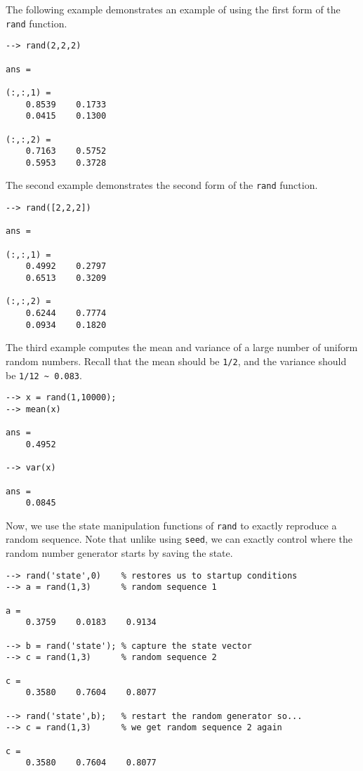 The following example demonstrates an example of using the first form of the \verb|rand| function.
\begin{verbatim}
--> rand(2,2,2)

ans = 

(:,:,1) = 
    0.8539    0.1733 
    0.0415    0.1300 

(:,:,2) = 
    0.7163    0.5752 
    0.5953    0.3728 
\end{verbatim}
The second example demonstrates the second form of the \verb|rand| function.
\begin{verbatim}
--> rand([2,2,2])

ans = 

(:,:,1) = 
    0.4992    0.2797 
    0.6513    0.3209 

(:,:,2) = 
    0.6244    0.7774 
    0.0934    0.1820 
\end{verbatim}
The third example computes the mean and variance of a large number of uniform random numbers.  Recall that the mean should be \verb|1/2|, and the variance should be \verb|1/12 ~ 0.083|.
\begin{verbatim}
--> x = rand(1,10000);
--> mean(x)

ans = 
    0.4952 

--> var(x)

ans = 
    0.0845 
\end{verbatim}
Now, we use the state manipulation functions of \verb|rand| to exactly reproduce 
a random sequence.  Note that unlike using \verb|seed|, we can exactly control where
the random number generator starts by saving the state.
\begin{verbatim}
--> rand('state',0)    % restores us to startup conditions
--> a = rand(1,3)      % random sequence 1

a = 
    0.3759    0.0183    0.9134 

--> b = rand('state'); % capture the state vector
--> c = rand(1,3)      % random sequence 2  

c = 
    0.3580    0.7604    0.8077 

--> rand('state',b);   % restart the random generator so...
--> c = rand(1,3)      % we get random sequence 2 again

c = 
    0.3580    0.7604    0.8077 
\end{verbatim}

